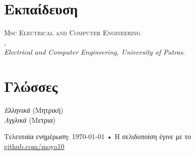 \documentclass[11pt, a4paper]{article}
\newcommand{\note}[1]{\marginnote{\scriptsize #1}}
\begin{document}
\section{Εκπαίδευση}
\noindent
\note{2012}\textsc{Msc Electrical and Computer Engineering}\\
\emph{, }\\
\emph{Electrical and Computer Engineering, University of Patras}.\\[.2cm]

\section{Γλώσσες}
\emph{Ελληνικά} (Μητρική)\\
\emph{Αγγλικά} (Μετρια)\\

\vfill{}

\begin{center}
{\scriptsize  Τελευταία ενημέρωση: \today\- •\-
Η σελιδοποίση έγινε με το \href{https://github.com/mrzool/cv-boilerplate}{
\XeTeX }\\
\href{http://github.com/moya10}{github.com/moya10}}
\end{center}
\end{document}

